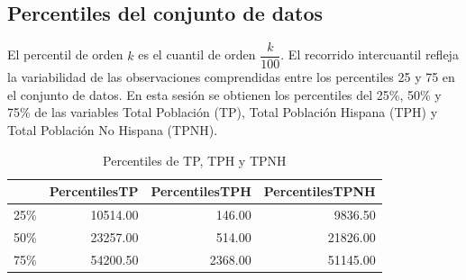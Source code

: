 \documentclass[conference]{IEEEtran}\usepackage[]{graphicx}\usepackage[]{color}
\begin{document}

\subsection{Percentiles del conjunto de datos}
El percentil de orden \(k\) es el cuantil de orden \(\dfrac {k} {100}\). El recorrido intercuantil refleja la variabilidad de las observaciones comprendidas entre los percentiles 25 y 75 en el conjunto de datos. En esta sesión se obtienen los percentiles del 25\%,  50\% y 75\% de las variables Total Población (TP), Total Población Hispana (TPH) y Total Población No Hispana (TPNH).

\vspace{-2mm}
\begin{table}[ht]
\centering
\begin{tabular}{rrrr}
  \hline
 & PercentilesTP & PercentilesTPH & PercentilesTPNH \\ 
  \hline
25\% & 10514.00 & 146.00 & 9836.50 \\ 
  50\% & 23257.00 & 514.00 & 21826.00 \\ 
  75\% & 54200.50 & 2368.00 & 51145.00 \\ 
   \hline
\end{tabular}
\caption{Percentiles de TP, TPH y TPNH} 
\end{table}

\vspace{-6mm}

\end{document}

